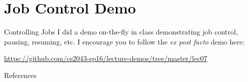 %
\section{Job Control Demo}
\label{sec:job_control_demo}

\begin{frame}[fragile]{Controlling Jobs}
  I did a demo on-the-fly in class demonstrating job control, pausing, resuming, etc.  I encourage you to follow
  the \emph{ex post facto} demo here:

  \begin{center}
    \href{https://github.com/cs2043-sp16/lecture-demos/tree/master/lec07}{https://github.com/cs2043-sp16/lecture-demos/tree/master/lec07}
  \end{center}
\end{frame}

%

\begin{frame}[allowframebreaks]{References}
  
  
\end{frame}


